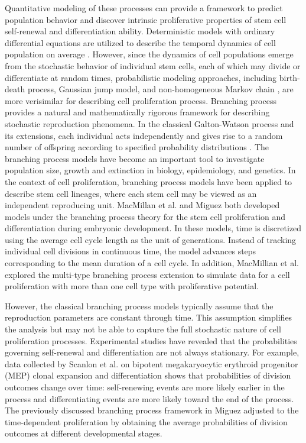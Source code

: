 \documentclass[pdflatex,sn-mathphys-num]{sn-jnl}
\theoremstyle{thmstyleone}%
\theoremstyle{thmstyletwo}%
\theoremstyle{thmstylethree}%
\begin{document}
Quantitative modeling of these processes can provide a framework to predict population behavior and discover intrinsic proliferative properties of stem cell self-renewal and differentiation ability. Deterministic models with ordinary differential equations are utilized to describe the temporal dynamics of cell population on average \cite{marciniak2009modeling, beretta2012mathematical, weekes2014multicompartment, chen2016overshoot}. However, since the dynamics of cell populations emerge from the stochastic behavior of individual stem cells, each of which may divide or differentiate at random times, probabilistic modeling approaches, including birth-death process, Gaussian jump model, and non-homogeneous Markov chain \cite{Tu2009, Ba2018, Sc2022}, are more verisimilar for describing cell proliferation process. Branching process provides a natural and mathematically rigorous framework for describing stochastic reproduction phenomena. In the classical Galton-Watson process and its extensions, each individual acts independently and gives rise to a random number of offspring according to specified probability distributions \cite{watson1875probability,harris1948branching, harris1963theory, asmussen1983branching}. The branching process models have become an important tool to investigate population size, growth and extinction in biology, epidemiology, and genetics. In the context of cell proliferation, branching process models have been applied to describe stem cell lineages, where each stem cell may be viewed as an independent reproducing unit. MacMillan et al. \cite{macmillan2011seeing} and Miguez \cite{miguez2015branching} both developed models under the branching process theory for the stem cell proliferation and differentiation during embryonic development. In these models, time is discretized using the average cell cycle length as the unit of generations. Instead of tracking individual cell divisions in continuous time, the model advances steps corresponding to the mean duration of a cell cycle. In addition, MacMillian et al. \cite{macmillan2011seeing} explored the multi-type branching process extension to simulate data for a cell proliferation with more than one cell type with proliferative potential.

However, the classical branching process models typically assume that the reproduction parameters are constant through time. This assumption simplifies the analysis but may not be able to capture the full stochastic nature of cell proliferation processes. Experimental studies have revealed that the probabilities governing self-renewal and differentiation are not always stationary. For example, data collected by Scanlon et al. \cite{Sc2022} on bipotent megakaryocytic erythroid progenitor (MEP) clonal
expansion and differentiation shows that probabilities of division outcomes change over time: self-renewing events are more likely earlier in the process and differentiating events are more likely toward the end of the process. The previously discussed branching process framework in Miguez \cite{miguez2015branching} adjusted to the time-dependent proliferation by obtaining the average probabilities of division outcomes at different developmental stages.
\end{document}
